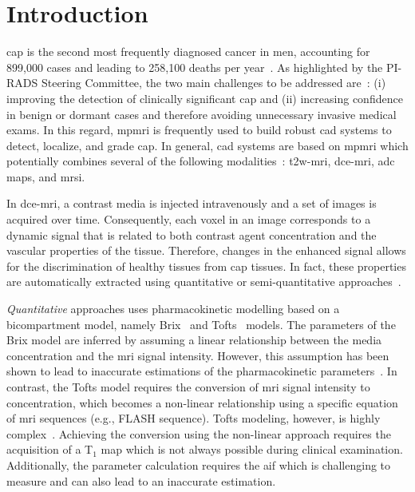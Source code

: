 \section{Introduction}

\Ac{cap} is the second most frequently diagnosed cancer in men,
accounting for 899,000 cases and leading to 258,100 deaths per year~\cite{ferlay2010estimates}.
As highlighted by the PI-RADS Steering Committee, the two main challenges to be addressed are~\cite{weinreb2016pi}:
(i) improving the detection of clinically significant \ac{cap} and
(ii) increasing confidence in benign or dormant cases and therefore avoiding unnecessary invasive medical exams.
In this regard, \ac{mpmri} is frequently used to build robust \ac{cad} systems to detect, localize, and grade \ac{cap}.
In general, \ac{cad} systems are based on \ac{mpmri} which potentially combines several of the following modalities~\cite{lemaitre2015computer}: \ac{t2w}-\ac{mri}, \ac{dce}-\ac{mri}, \ac{adc} maps, and \ac{mrsi}.

In \ac{dce}-\ac{mri}, a contrast media is injected intravenously and a set of images is acquired over time.
Consequently, each voxel in an image corresponds to a dynamic signal that is related to both contrast agent concentration and the vascular properties of the tissue.
Therefore, changes in the enhanced signal allows for the
discrimination of healthy tissues from \ac{cap} tissues.
In fact, these properties are automatically extracted using quantitative or semi-quantitative approaches~\cite{lemaitre2015computer}.

\emph{Quantitative} approaches uses pharmacokinetic modelling based on a bicompartment model, namely Brix~\cite{brix1991pharmacokinetic} and Tofts~\cite{tofts1995quantitative} models.
The parameters of the Brix model are inferred by assuming a linear relationship between the media concentration and the \ac{mri} signal intensity.
However, this assumption has been shown to lead to inaccurate
estimations of the pharmacokinetic parameters~\cite{heilmann2006determination}.
In contrast, the Tofts model requires the conversion of \ac{mri}
signal intensity to concentration, which becomes a non-linear
relationship using a specific equation of \ac{mri} sequences (e.g., FLASH sequence).
Tofts modeling, however, is highly complex~\cite{gliozzi2011phenomenological}.
Achieving the conversion using the non-linear approach requires the
acquisition of a T$_1$ map which is not always possible during clinical examination.
Additionally, the parameter calculation requires the \ac{aif} which is challenging to measure and can also lead to an inaccurate estimation.

